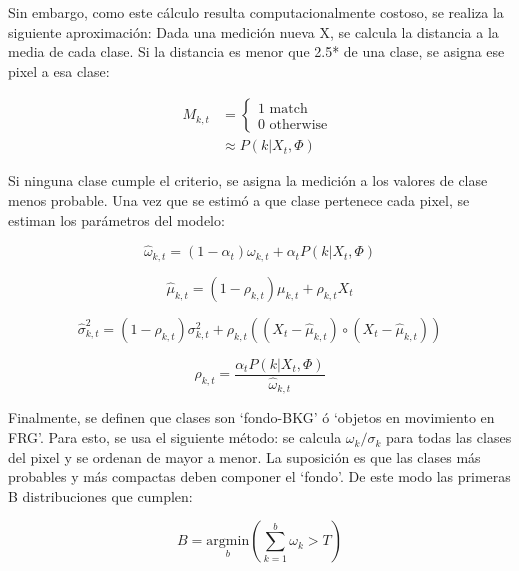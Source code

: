 \documentclass[12pt,a4paper]{article}
\begin{document}
Sin embargo, como este cálculo resulta computacionalmente costoso, se realiza la siguiente aproximación: Dada una medición nueva X, se calcula la distancia a la media de cada clase. Si la distancia es menor que 2.5* de una clase, se asigna ese pixel a esa clase:

\begin{equation}
  \begin{split}
    M_{k,t} & = \begin{cases}
                  1 \text{ match }
                \\
                  0 \text{ otherwise }
                \end{cases}
  \\
            & \approx P\left(k|X_t,\Phi\right)
  \end{split}
\end{equation}

Si ninguna clase cumple el criterio, se asigna la medición a los valores de clase menos probable.
Una vez que se estimó a que clase pertenece cada pixel, se estiman  los parámetros del modelo:

\begin{equation}
  \hat{\omega}_{k,t} = \left(1 - \alpha_t\right) \omega_{k,t} + \alpha_t P\left(k|X_t,\Phi\right)
\end{equation}

\begin{equation}
  \hat{\mu}_{k,t} = \left(1 - \rho_{k,t}\right) \mu_{k,t} + \rho_{k,t} X_t
\end{equation}

\begin{equation}
  \hat{\sigma}^2_{k,t} = \left(1 - \rho_{k,t}\right) \sigma^2_{k,t} + \rho_{k,t} \left(\left(X_t-\hat{\mu}_{k,t}\right)\circ\left(X_t-\hat{\mu}_{k,t}\right)\right)
\end{equation}

\begin{equation}
  \rho_{k,t} = \frac{\alpha_t P\left(k|X_t,\Phi\right)}{\hat{\omega}_{k,t}}
\end{equation}

Finalmente, se definen que clases son ‘fondo-BKG’ ó  ‘objetos en movimiento en FRG’. Para esto, se usa el siguiente método: se calcula $\omega_k/\sigma_k$ para todas las clases del pixel y se ordenan de mayor a menor. La suposición es que las clases más probables y más compactas deben componer el ‘fondo’. De este modo las primeras B distribuciones que cumplen:

\begin{equation}
  B = \underset{b}{\text{argmin}}\left(\sum\limits_{k=1}^b \omega_k>T\right)
\end{equation}
\end{document}

